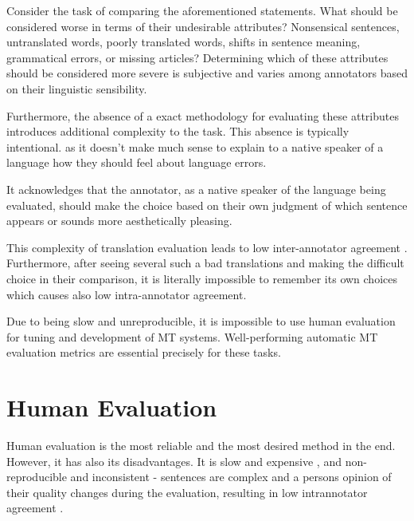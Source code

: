 Consider the task of comparing the aforementioned statements. What should be considered worse in terms of their undesirable attributes? Nonsensical sentences, untranslated words, poorly translated words, shifts in sentence meaning, grammatical errors, or missing articles? Determining which of these attributes should be considered more severe is subjective and varies among annotators based on their linguistic sensibility. 

Furthermore, the absence of a exact methodology for evaluating these attributes introduces additional complexity to the task. This absence is typically intentional. as it doesn't make much sense to explain to a native speaker of a language how they should feel about language errors.


It acknowledges that the annotator, as a native speaker of the language being evaluated, should make the choice based on their own judgment of which sentence appears or sounds more aesthetically pleasing.

This complexity of translation evaluation leads to low inter-annotator agreement \cite{wmt13}. 
Furthermore, after seeing several such a bad translations and making the difficult choice in their comparison, it is literally impossible to remember its own choices which causes also low intra-annotator agreement.

Due to being slow and unreproducible, it is impossible to use human evaluation for tuning and development of MT systems. 
Well-performing automatic MT evaluation metrics are essential precisely for these tasks. 









\section{Human Evaluation}
Human evaluation is the most reliable and the most desired method in the end.
However, it has also its disadvantages. 
It is slow and expensive , and non-reproducible and inconsistent - sentences are complex and a persons opinion of their quality changes during the evaluation, resulting in low intrannotator agreement .

